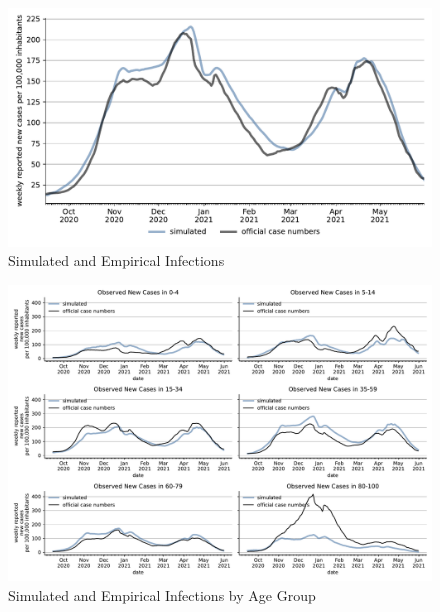 \begin{figure}[ht]
\centering
  \includegraphics[width=\textwidth]{../figures/results/figures/scenario_comparisons/combined_fit/full_new_known_case}
\caption{Simulated and Empirical Infections}
\label{fig:aggregated_fit}
\end{figure}



\begin{figure}[ht]
\centering
  \includegraphics[width=\textwidth]{../figures/results/figures/incidences_by_group/age_group_rki/full_combined_baseline_new_known_case}
\caption{Simulated and Empirical Infections by Age Group}
\label{fig:age_group_fit}
\end{figure}


